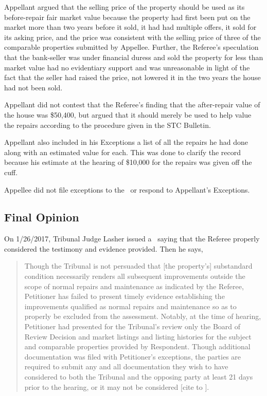 \documentclass[12pt,\documentclassflag]{michiganCourtOfAppealsBrief}
\def\ttr287{\pincite[s]{TTR}{287}}
\begin{document}
Appellant argued that the selling price of the property should be used as its before-repair fair market value because the property had first been put on the market more than two years before it sold, it had had multiple offers, it sold for its asking price, and the price was consistent with the selling price of three of the comparable properties submitted by Appellee. Further, the Referee's speculation that the bank-seller was under financial duress and sold the property for less than market value had no evidentiary support and was unreasonable in light of the fact that the seller had raised the price, not lowered it in the two years the house had not been sold.

Appellant did not contest that the Referee's finding that the after-repair value of the house was \$50,400, but argued that it should merely be used to help value the repairs according to the procedure given in the STC Bulletin.

Appellant also included in his Exceptions a list of all the repairs he had done along with an estimated value for each. This was done to clarify the record because his estimate at the hearing of \$10,000 for the repairs was given off the cuff.

Appellee did not file exceptions to the \POJ\ or respond to Appellant's Exceptions.

\subsection{Final Opinion}
On 1/26/2017, Tribunal Judge Lasher issued a \FOJ\ saying that the Referee properly considered the testimony and evidence provided. Then he says,

\begin{quote}%
Though the Tribunal is not persuaded that [the property's] substandard condition necessarily renders all subsequent improvements outside the scope of normal repairs and maintenance as indicated by the Referee, Petitioner has failed to present timely evidence establishing the improvements qualified as normal repairs and maintenance so as to properly be excluded from the assessment. Notably, at the time of hearing, Petitioner had presented for the Tribunal's review only the Board of Review Decision and market listings and listing histories for the subject and comparable properties provided by Respondent. Though additional documentation was filed with Petitioner's exceptions, the parties are required to submit any and all documentation they wish to have considered to both the Tribunal and the opposing party at least 21 days prior to the hearing, or it may not be considered [cite to \ttr287].
\end{quote}
\end{document}
